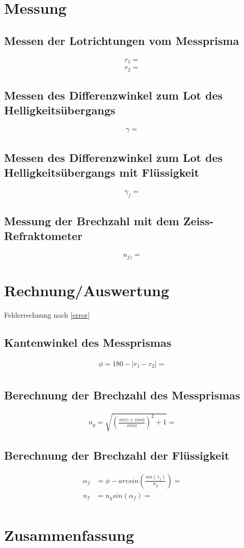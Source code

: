 \documentclass[a4paper]{article}
\begin{document}
\section{Messung}
\subsection{Messen der Lotrichtungen vom Messprisma}
\begin{align}
  r_1 = \\
  r_2 = 
\end{align}

\subsection{Messen des Differenzwinkel zum Lot des Helligkeitsübergangs}
\begin{align}
  \gamma=
\end{align}

\subsection{Messen des Differenzwinkel zum Lot des Helligkeitsübergangs mit Flüssigkeit}
\begin{align}
  \gamma_f=
\end{align}

\subsection{Messung der Brechzahl mit dem Zeiss-Refraktometer}
\begin{align}
  n_{fz}=  
\end{align}

\section{Rechnung/Auswertung}
Fehlerrechnung nach \ref{error}
\subsection{Kantenwinkel des Messprismas}
\begin{align}
 \phi = 180-\left| r_1-r_2 \right|=\\
\end{align}

\subsection{Berechnung der Brechzahl des Messprismas}
\begin{align}
  n_g=\sqrt{\left(\frac{sin \gamma + cos \phi}{sin \phi}\right)^2+1}=
  \label{}
\end{align}

\subsection{Berechnung der Brechzahl der Flüssigkeit}
\begin{align}
  \alpha_f &= \phi - arcsin\left(\frac{sin(\gamma_f)}{n_g}\right)=\\
  n_f&=n_g sin(\alpha_f)= \\
\end{align}

\section{Zusammenfassung}
\end{document}
